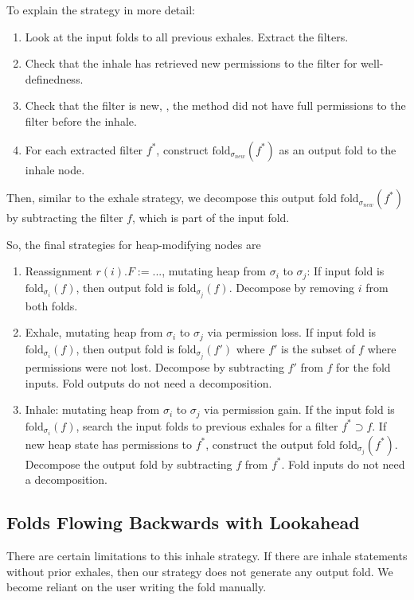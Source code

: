 \documentclass[msc,oneside]{ubcthesis}
\begin{document}
To explain the strategy in more detail:
\begin{enumerate}
    \item Look at the input folds to all previous exhales. Extract the filters.
    \item Check that the inhale has retrieved new permissions to the filter for well-definedness. 
    \item Check that the filter is new, \ie, the method did not have full permissions to the filter before the inhale. 
    \item For each extracted filter $f^*$, construct $\textrm{fold}_{\sigma_{new}}(f^*)$ as an output fold to the inhale node.
\end{enumerate}

Then, similar to the exhale strategy, we decompose this output fold $\textrm{fold}_{\sigma_{new}}(f^*)$ by subtracting the filter $f$, which is part of the input fold.

So, the final strategies for heap-modifying nodes are
\begin{enumerate}
    \item Reassignment $r(i).F := ...$, mutating heap from $\sigma_i$ to $\sigma_j$: 
    If input fold is $\textrm{fold}_{\sigma_i}(f)$, then output fold is $\textrm{fold}_{\sigma_j}(f)$. 
    Decompose by removing $i$ from both folds.
    \item Exhale, mutating heap from $\sigma_i$ to $\sigma_j$ via permission loss. If input fold is $\textrm{fold}_{\sigma_i}(f)$, then output fold is $\textrm{fold}_{\sigma_j}(f')$ where $f'$ is the subset of $f$ where permissions were not lost. Decompose by subtracting $f'$ from $f$ for the fold inputs. Fold outputs do not need a decomposition.
    \item Inhale: mutating heap from $\sigma_i$ to $\sigma_j$ via permission gain. If the input fold is $\textrm{fold}_{\sigma_i}(f)$, search the input folds to previous exhales for a filter $f^* \supset f$. If new heap state has permissions to $f^*$, construct the output fold $\textrm{fold}_{\sigma_j}(f^*)$. Decompose the output fold by subtracting $f$ from $f^*$. Fold inputs do not need a decomposition.
\end{enumerate}

\subsection{Folds Flowing Backwards with Lookahead}
There are certain limitations to this inhale strategy. If there are inhale statements without prior exhales, then our strategy does not generate any output fold. We become reliant on the user writing the fold manually. 
\end{document}
